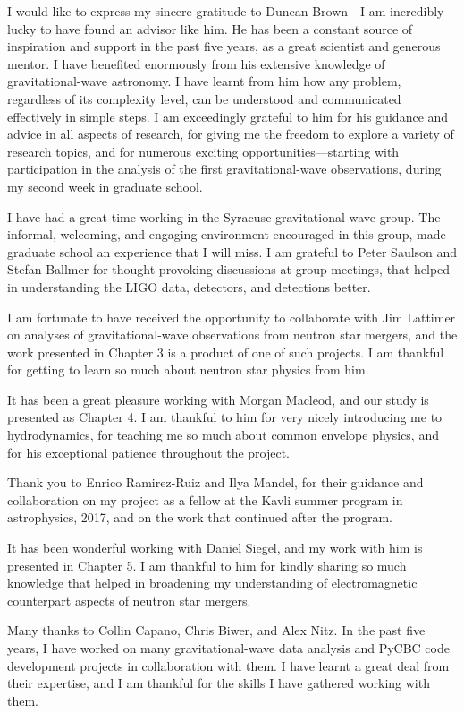 
I would like to express my sincere gratitude to Duncan Brown---I am incredibly lucky to have found an advisor like him. He has been a constant source of inspiration and support in the past five years, as a great scientist and generous mentor. I have benefited enormously from his extensive knowledge of gravitational-wave astronomy. I have learnt from him how any problem, regardless of its complexity level, can be understood and communicated effectively in simple steps. I am exceedingly grateful to him for his guidance and advice in all aspects of research, for giving me the freedom to explore a variety of research topics, and for numerous exciting opportunities---starting with participation in the analysis of the first gravitational-wave observations, during my second week in graduate school.

I have had a great time working in the Syracuse gravitational wave group. The informal, welcoming, and engaging environment encouraged in this group, made graduate school an experience that I will miss. I am grateful to Peter Saulson and Stefan Ballmer for thought-provoking discussions at group meetings, that helped in understanding the LIGO data, detectors, and detections better.

I am fortunate to have received the opportunity to collaborate with Jim Lattimer on analyses of gravitational-wave observations from neutron star mergers, and the work presented in Chapter 3 is a product of one of such projects. I am thankful for getting to learn so much about neutron star physics from him.

It has been a great pleasure working with Morgan Macleod, and our study is presented as Chapter 4. I am thankful to him for very nicely introducing me to hydrodynamics, for teaching me so much about common envelope physics, and for his exceptional patience throughout the project.

Thank you to Enrico Ramirez-Ruiz and Ilya Mandel, for their guidance and collaboration on my project as a fellow at the Kavli summer program in astrophysics, 2017, and on the work that continued after the program.

It has been wonderful working with Daniel Siegel, and my work with him is presented in Chapter 5. I am thankful to him for kindly sharing so much knowledge that helped in broadening my understanding of electromagnetic counterpart aspects of neutron star mergers.

Many thanks to Collin Capano, Chris Biwer, and Alex Nitz. In the past five years, I have worked on many gravitational-wave data analysis and PyCBC code development projects in collaboration with them. I have learnt a great deal from their expertise, and I am thankful for the skills I have gathered working with them.

